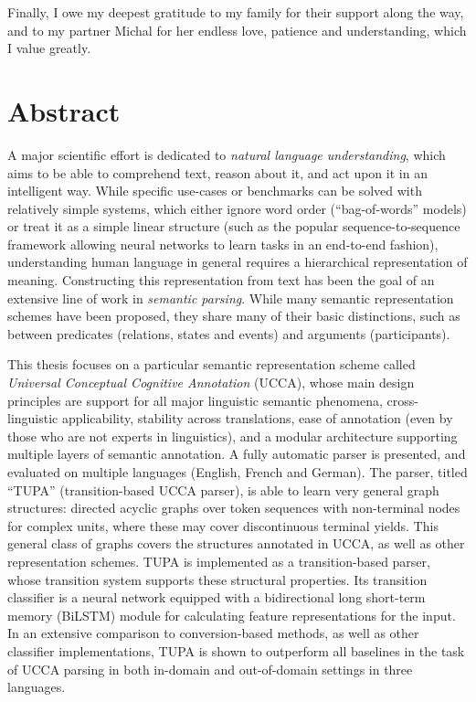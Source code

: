 \documentclass[12pt,a4paper]{report}
\begin{document}
Finally, I owe my deepest gratitude to my family for their support along the way,
and to my partner Michal for her endless love, patience and understanding,
which I value greatly.

\pagebreak

\section*{Abstract}

A major scientific effort is dedicated to \textit{natural language understanding},
which aims to be able to comprehend text, reason about it, and act upon it
in an intelligent way.
While specific use-cases or benchmarks can be solved with relatively simple
systems, which either ignore word order (``bag-of-words'' models) or treat
it as a simple linear structure
(such as the popular sequence-to-sequence framework allowing neural networks
to learn tasks in an end-to-end fashion),
understanding human language in general
requires a hierarchical representation of meaning.
Constructing this representation from text has been the goal of an extensive
line of work in \textit{semantic parsing}.
While many semantic representation schemes have been proposed,
they share many of their basic distinctions, such as between predicates
(relations, states and events) and arguments (participants).

This thesis focuses on a particular semantic representation scheme called
\textit{Universal Conceptual Cognitive Annotation} (UCCA),
whose main design principles are support for all major linguistic semantic phenomena,
cross-linguistic applicability, stability across translations,
ease of annotation (even by those who are not experts in linguistics),
and a modular architecture supporting multiple layers of semantic annotation.
A fully automatic parser is presented, and evaluated on multiple languages
(English, French and German).
The parser, titled ``TUPA'' (transition-based UCCA parser),
is able to learn very general graph structures:
directed acyclic graphs over token sequences with non-terminal nodes for complex
units, where these may cover discontinuous terminal yields.
This general class of graphs covers the structures annotated in UCCA,
as well as other representation schemes.
TUPA is implemented as a transition-based parser, whose transition system
supports these structural properties.
Its transition classifier is a neural network equipped with a
bidirectional long short-term memory (BiLSTM) module for calculating
feature representations for the input.
In an extensive comparison to conversion-based methods, as well as
other classifier implementations, TUPA is shown to outperform all baselines
in the task of UCCA parsing in both in-domain and out-of-domain settings
in three languages.
\end{document}
